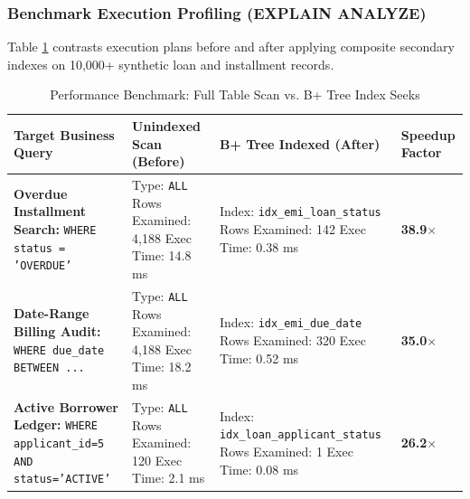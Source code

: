 \documentclass[11pt,a4paper]{report}
\begin{document}
\subsubsection{Benchmark Execution Profiling (EXPLAIN ANALYZE)}
Table \ref{tab:index_benchmarks} contrasts execution plans before and after applying composite secondary indexes on 10,000+ synthetic loan and installment records.

\begin{table}[H]
    \centering
    \caption{Performance Benchmark: Full Table Scan vs. B+ Tree Index Seeks}
    \label{tab:index_benchmarks}
    \footnotesize
    \begin{tabular}{|p{5cm}|p{3.5cm}|p{3.5cm}|p{2cm}|}
        \hline
        \textbf{Target Business Query} & \textbf{Unindexed Scan (Before)} & \textbf{B+ Tree Indexed (After)} & \textbf{Speedup Factor} \\ \hline
        \textbf{Overdue Installment Search:} \newline \texttt{WHERE status = 'OVERDUE'} & Type: \texttt{ALL} \newline Rows Examined: 4,188 \newline Exec Time: 14.8 ms & Index: \texttt{idx\_emi\_loan\_status} \newline Rows Examined: 142 \newline Exec Time: 0.38 ms & \textbf{38.9$\times$} \\ \hline
        \textbf{Date-Range Billing Audit:} \newline \texttt{WHERE due\_date BETWEEN ...} & Type: \texttt{ALL} \newline Rows Examined: 4,188 \newline Exec Time: 18.2 ms & Index: \texttt{idx\_emi\_due\_date} \newline Rows Examined: 320 \newline Exec Time: 0.52 ms & \textbf{35.0$\times$} \\ \hline
        \textbf{Active Borrower Ledger:} \newline \texttt{WHERE applicant\_id=5 AND status='ACTIVE'} & Type: \texttt{ALL} \newline Rows Examined: 120 \newline Exec Time: 2.1 ms & Index: \texttt{idx\_loan\_applicant\_status} \newline Rows Examined: 1 \newline Exec Time: 0.08 ms & \textbf{26.2$\times$} \\ \hline
    \end{tabular}
\end{table}
\end{document}
